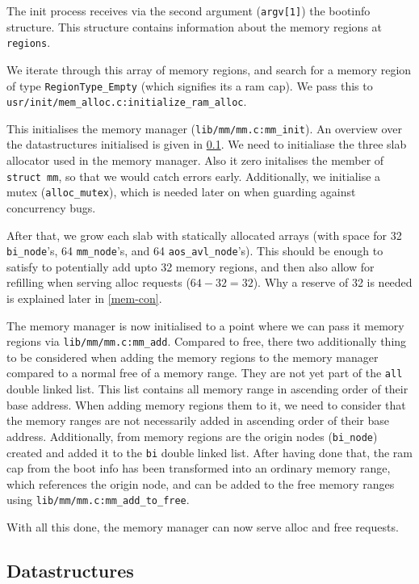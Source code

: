 The init process receives via the second argument (\verb|argv[1]|) the bootinfo
structure.
This structure contains information about the memory regions at \verb|regions|.

We iterate through this array of memory regions, and search for a memory region
of type \verb|RegionType_Empty| (which signifies its a ram cap).
We pass this to \verb|usr/init/mem_alloc.c:initialize_ram_alloc|.

This initialises the memory manager (\verb|lib/mm/mm.c:mm_init|).
An overview over the datastructures initialised is given in \ref{mem-data}.
We need to initialiase the three slab allocator used in the memory manager.
Also it zero initalises the member of \verb|struct mm|, so that we would catch
errors early.
Additionally, we initialise a mutex (\verb|alloc_mutex|), which is needed later
on when guarding against concurrency bugs.

After that, we grow each slab with statically allocated arrays (with space for
32 \verb|bi_node|'s, 64 \verb|mm_node|'s, and 64 \verb|aos_avl_node|'s).
This should be enough to satisfy to potentially add upto 32 memory regions,
and then also allow for refilling when serving alloc requests ($64-32=32$).
Why a reserve of 32 is needed is explained later in \ref{mem-con}.

The memory manager is now initialised to a point where we can pass it memory
regions via \verb|lib/mm/mm.c:mm_add|.
Compared to free, there two additionally thing to be considered when adding the
memory regions to the memory manager compared to a normal free of a memory
range.
They are not yet part of the \verb|all| double linked list.
This list contains all memory range in ascending order of their base address.
When adding memory regions them to it, we need to consider that the memory
ranges are not necessarily added in ascending order of their base address.
Additionally, from memory regions are the origin nodes (\verb|bi_node|) created
and added it to the \verb|bi| double linked list.
After having done that, the ram cap from the boot info has been transformed into
an ordinary memory range, which references the origin node, and can be added to
the free memory ranges using \verb|lib/mm/mm.c:mm_add_to_free|.

With all this done, the memory manager can now serve alloc and free requests.

\subsection{Datastructures} \label{mem-data}

